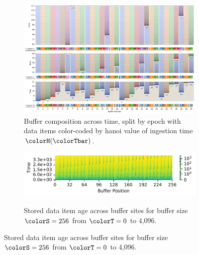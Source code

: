 \begin{figure}[htbp!]
  \centering

\begin{subfigure}[b]{\linewidth}
\includegraphics[width=\linewidth]{
binder/teeplots/41/num-generations=128+surface-size=32+viz=site-reservation-by-rank-spliced-at-heatmap+ext=}
\vspace{-4ex}\caption{
  Buffer composition across time, split by epoch with data items color-coded by hanoi value of ingestion time $\colorH(\colorTbar)$.
}
\label{fig:hsurf-stretched-implementation-schematic}
\end{subfigure}

\vspace{1ex}\begin{minipage}[]{\textwidth}
 \vspace{-2pt}
  \begin{subfigure}[t]{0.7\linewidth}
    \vspace{0pt}
    \centering
  \includegraphics[width=0.88\linewidth,clip]{binder/teeplots/41/cnorm=log+num-generations=4096+surface-size=256+viz=site-ingest-depth-by-rank-heatmap+ynorm=linear+ext=}
  \end{subfigure}%
  \begin{subfigure}[t]{0.3\linewidth}
  \vspace{-2pt}
  \caption{%
    Stored data item age across buffer sites for buffer size $\colorS=256$ from $\colorT=0$ to 4,096.
  }
  \label{fig:hsurf-stretched-implementation-heatmap}
\end{subfigure}
\end{minipage}


\end{figure}
